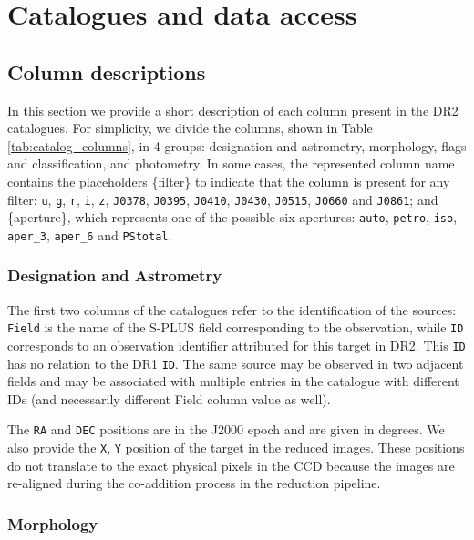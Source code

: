 \documentclass[fleqn,usenatbib]{mnras}
\begin{document}
\section{Catalogues and data access}
\label{sec::Catalogs}


\subsection{Column descriptions}

In this section we provide a short description of each column present in the DR2 catalogues. For simplicity, we divide the columns, shown in Table \ref{tab:catalog_columns}, in 4 groups: designation and astrometry, morphology, flags and classification, and photometry. In some cases, the represented column name contains the placeholders \{filter\} to indicate that the column is present for any filter: \texttt{u}, \texttt{g}, \texttt{r}, \texttt{i}, \texttt{z}, \texttt{J0378}, \texttt{J0395}, \texttt{J0410}, \texttt{J0430}, \texttt{J0515}, \texttt{J0660} and \texttt{J0861}; and \{aperture\}, which represents one of the possible six apertures: \texttt{auto}, \texttt{petro}, \texttt{iso}, \texttt{aper\_3}, \texttt{aper\_6} and \texttt{PStotal}.

\subsubsection{Designation and Astrometry}

The first two columns of the catalogues refer to the identification of the sources: \texttt{Field} is the name of the S-PLUS field corresponding to the observation, while \texttt{ID} corresponds to an observation identifier attributed for this target in DR2. This \texttt{ID} has no relation to the DR1 \texttt{ID}. The same source may be observed in two adjacent fields and may be associated with multiple entries in the catalogue with different IDs (and necessarily different Field column value as well).

The \texttt{RA} and \texttt{DEC} positions are in the J2000 epoch and are given in degrees. We also provide the \texttt{X}, \texttt{Y} position of the target in the reduced images. These positions do not translate to the exact physical pixels in the CCD because the images are re-aligned during the co-addition process in the reduction pipeline.

\subsubsection{Morphology}
\end{document}
